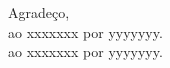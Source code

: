 \begin{agradecimentos}

	\noindent Agradeço,\\[2mm]
	ao xxxxxxx por yyyyyyy.\\[2mm]
	ao xxxxxxx por yyyyyyy.

\end{agradecimentos}
